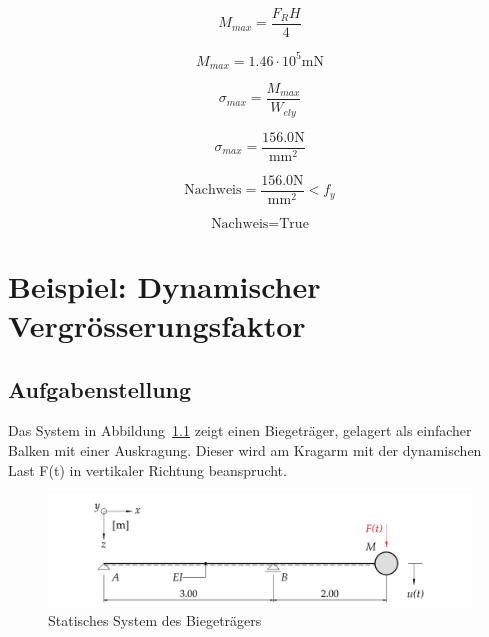 \documentclass[
  letterpaper,
  DIV=11]{scrreprt}
\begin{document}
\begin{equation}M_{max} = \frac{F_{R} H}{4}\end{equation}

\begin{equation}M_{max} = 1.46 \cdot 10^{5} \text{m} \text{N}\end{equation}

\begin{equation}\sigma_{max} = \frac{M_{max}}{W_{el y}}\end{equation}

\begin{equation}\sigma_{max} = \frac{156.0 \text{N}}{\text{mm}^{2}}\end{equation}

\begin{equation}\text{Nachweis} = \frac{156.0 \text{N}}{\text{mm}^{2}} < f_{y}\end{equation}

\begin{equation}\text{Nachweis} = \text{True}\end{equation}

\hypertarget{beispiel-dynamischer-vergruxf6sserungsfaktor}{%
\chapter{Beispiel: Dynamischer
Vergrösserungsfaktor}\label{beispiel-dynamischer-vergruxf6sserungsfaktor}}

\hypertarget{aufgabenstellung-5}{%
\section{Aufgabenstellung}\label{aufgabenstellung-5}}

Das System in Abbildung~\ref{fig-ems_dyn_verg_system_biegetrager} zeigt
einen Biegeträger, gelagert als einfacher Balken mit einer Auskragung.
Dieser wird am Kragarm mit der dynamischen Last F(t) in vertikaler
Richtung beansprucht.

\begin{figure}[H]

{\centering \includegraphics{index_files/mediabag/bilder/aufgabe_ems_dynamischer_vergroesserungsfaktor.pdf}

}

\caption{\label{fig-ems_dyn_verg_system_biegetrager}Statisches System
des Biegeträgers}

\end{figure}
\end{document}
